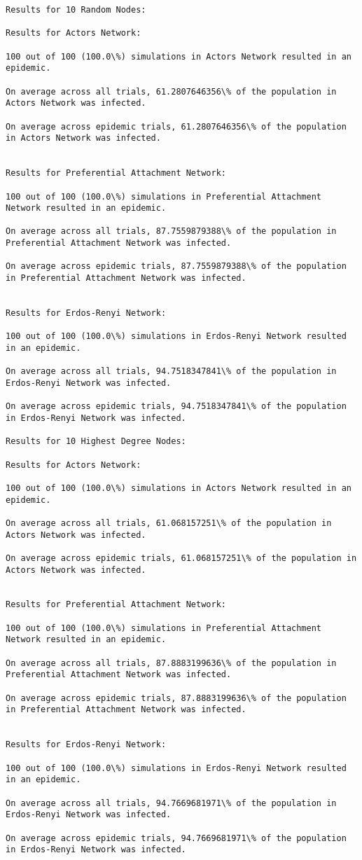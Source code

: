 \documentclass[11pt]{article}
\begin{document}
    \begin{Verbatim}[commandchars=\\\{\}]
Results for 10 Random Nodes:

Results for Actors Network:

100 out of 100 (100.0\%) simulations in Actors Network resulted in an epidemic.

On average across all trials, 61.2807646356\% of the population in Actors Network was infected.

On average across epidemic trials, 61.2807646356\% of the population in Actors Network was infected.


Results for Preferential Attachment Network:

100 out of 100 (100.0\%) simulations in Preferential Attachment Network resulted in an epidemic.

On average across all trials, 87.7559879388\% of the population in Preferential Attachment Network was infected.

On average across epidemic trials, 87.7559879388\% of the population in Preferential Attachment Network was infected.


Results for Erdos-Renyi Network:

100 out of 100 (100.0\%) simulations in Erdos-Renyi Network resulted in an epidemic.

On average across all trials, 94.7518347841\% of the population in Erdos-Renyi Network was infected.

On average across epidemic trials, 94.7518347841\% of the population in Erdos-Renyi Network was infected.

Results for 10 Highest Degree Nodes:

Results for Actors Network:

100 out of 100 (100.0\%) simulations in Actors Network resulted in an epidemic.

On average across all trials, 61.068157251\% of the population in Actors Network was infected.

On average across epidemic trials, 61.068157251\% of the population in Actors Network was infected.


Results for Preferential Attachment Network:

100 out of 100 (100.0\%) simulations in Preferential Attachment Network resulted in an epidemic.

On average across all trials, 87.8883199636\% of the population in Preferential Attachment Network was infected.

On average across epidemic trials, 87.8883199636\% of the population in Preferential Attachment Network was infected.


Results for Erdos-Renyi Network:

100 out of 100 (100.0\%) simulations in Erdos-Renyi Network resulted in an epidemic.

On average across all trials, 94.7669681971\% of the population in Erdos-Renyi Network was infected.

On average across epidemic trials, 94.7669681971\% of the population in Erdos-Renyi Network was infected.


    \end{Verbatim}


    
    
    
    
\end{document}
